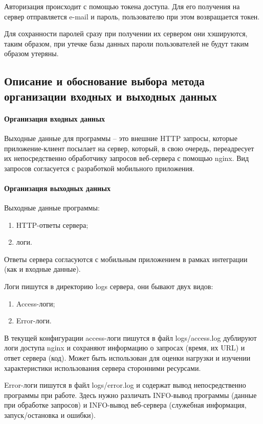 \documentclass[explnote]{espd}
\begin{document}
Авторизация происходит с помощью токена доступа. Для его получения на сервер отправляется e-mail и пароль, пользователю при этом возвращается токен.

Для сохранности паролей сразу при получении их сервером они хэшируются, таким образом, при утечке базы данных пароли пользователей не будут таким образом утеряны.

\subsection{Описание и обоснование выбора метода организации входных и выходных данных}
\paragraph{Организация входных данных}
Выходные данные для программы -- это внешние HTTP запросы, которые приложение-клиент посылает на сервер, который, в свою очередь, переадресует их непосредственно обработчику запросов веб-сервера с помощью nginx. Вид запросов согласуется с разработкой мобильного приложения.

\paragraph{Организация выходных данных}\label{paragraph:output}
Выходные данные программы:

\begin{enumerate}
\item HTTP-ответы сервера;
\item логи.
\end{enumerate}

Ответы сервера согласуются с мобильным приложением в рамках интеграции (как и входные данные).

Логи пишутся в директорию logs сервера, они бывают двух видов:

\begin{enumerate}
\item Access-логи;
\item Error-логи.
\end{enumerate}

В текущей конфигурации access-логи пишутся в файл logs/access.log дублируют логи доступа nginx и сохраняют информацию о запросах (время, их URL) и ответ сервера (код). Может быть использован для оценки нагрузки и изучении характеристики использования сервера сторонними ресурсами.

Error-логи пишутся в файл logs/error.log и содержат вывод непосредственно программы при работе. Здесь нужно различать INFO-вывод программы (данные при обработке запросов) и INFO-вывод веб-сервера (служебная информация, запуск/остановка и ошибки).
\end{document}
